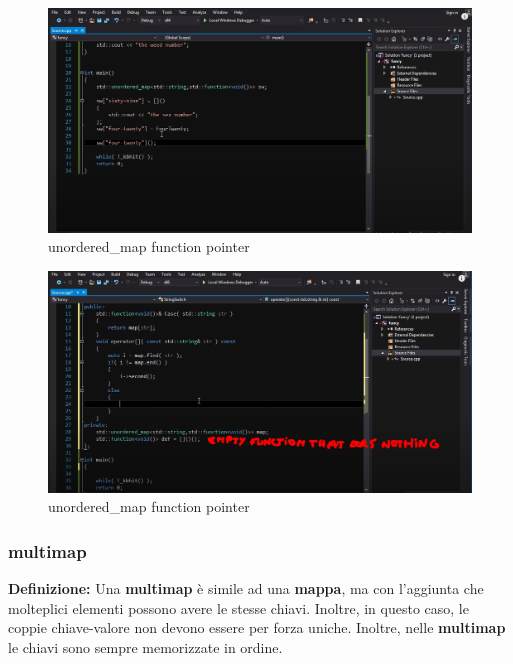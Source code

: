 \begin{figure}[H]
	\centering
	\includegraphics[width=1.2\textwidth, height=1.2\textheight, keepaspectratio]{./imgs/function_pointers_unordered_map_functional_std_function2.png}
	\caption{unordered\_map function pointer}
	\label{fig:function_pointers_unordered_map_functional_std_function2}
\end{figure}

\begin{figure}[H]
	\centering
	\includegraphics[width=1.2\textwidth, height=1.2\textheight, keepaspectratio]{./imgs/function_pointers_unordered_map_functional_std_function3.png}
	\caption{unordered\_map function pointer}
	\label{fig:function_pointers_unordered_map_functional_std_function3}
\end{figure}

\subsubsection{multimap}

\textsf{\small \textbf{Definizione: } Una \textbf{multimap} è simile ad una \textbf{mappa}, ma con l'aggiunta che molteplici elementi possono avere le stesse chiavi. Inoltre, in questo caso, le coppie chiave-valore non devono essere per forza uniche. Inoltre, nelle \textbf{multimap} le chiavi sono sempre memorizzate in ordine.} \\

